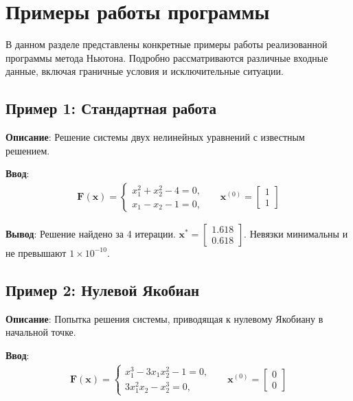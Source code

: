 \newpage
\section{Примеры работы программы}

В данном разделе представлены конкретные примеры работы реализованной программы метода Ньютона. Подробно рассматриваются различные входные данные, включая граничные условия и исключительные ситуации.

\subsection{Пример 1: Стандартная работа}
\textbf{Описание}: Решение системы двух нелинейных уравнений с известным решением.

\textbf{Ввод}: 
\begin{align*}
\mathbf{F}(\mathbf{x}) = \begin{cases}
x_1^2 + x_2^2 - 4 = 0,\\
x_1 - x_2 - 1 = 0,
\end{cases}
&& \mathbf{x}^{(0)} = \begin{bmatrix}
1 \\
1
\end{bmatrix}
\end{align*}

\textbf{Вывод}: Решение найдено за 4 итерации. \( \mathbf{x}^{*} = \begin{bmatrix}
1.618 \\
0.618
\end{bmatrix} \). Невязки минимальны и не превышают \( 1 \times 10^{-10} \).

\subsection{Пример 2: Нулевой Якобиан}
\textbf{Описание}: Попытка решения системы, приводящая к нулевому Якобиану в начальной точке.

\textbf{Ввод}: 
\begin{align*}
\mathbf{F}(\mathbf{x}) = \begin{cases}
x_1^3 - 3x_1x_2^2 - 1 = 0,\\
3x_1^2x_2 - x_2^3 = 0,
\end{cases}
&& \mathbf{x}^{(0)} = \begin{bmatrix}
0 \\
0
\end{bmatrix}
\end{align*}

